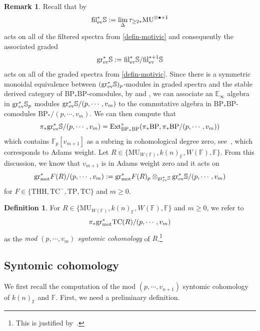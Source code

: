 \documentclass[english,10pt]{amsart}
\newcommand{\field}{\mathbb{F}}
\theoremstyle{definition}
\newtheorem{defi}{Definition}[section]
\newtheorem{rema}{Remark}[section]
\numberwithin{equation}{section}
\newcommand{\grmot}{\mathrm{gr}_{\textup{mot}}^*}
\begin{document}
\begin{rema}\label{rema:vn}
Recall that by~\cite[Corollary~2.2.21]{hahn2022motivic}
\[\mathrm{fil}_{\textup{ev}}^*\mathbb{S}:=\lim_{\Delta} \tau_{\ge 2*}\mathrm{MU}^{\otimes \bullet+1} 
\]
acts on all of the filtered spectra from \autoref{defin-motivic} and consequently the associated graded 
\[\mathrm{gr}_{\textup{ev}}^*\mathbb{S}:=\mathrm{fil}_{\textup{ev}}^*\mathbb{S}/\mathrm{fil}_{\textup{ev}}^{*+1}\mathbb{S}
\]
acts on all of the graded spectra from \autoref{defin-motivic}. Since there is a symmetric monoidal equivalence between $(\mathrm{gr}_{\textup{ev}}^*\mathbb{S})_p$-modules in graded spectra and the stable derived category of 
$\mathrm{BP}_*\mathrm{BP}$-comodules, by \cite[Corollary~1.1.6]{hahn2022motivic} and \cite[Corollary~1.2]{GWZ21},
we can associate an $\mathbb{E}_{\infty}$ algebra in $\mathrm{gr}_{\textup{ev}}^*\mathbb{S}_p$  modules $\mathrm{gr}_{\textup{ev}}^*\mathbb{S}/(p,\cdots ,v_m)$ to the commutative algebra in $\mathrm{BP}_*\mathrm{BP}$-comodules $\mathrm{BP}_*/(p,\cdots ,v_m)$. We can then compute that 
\[ \pi_*\mathrm{gr}_{\textup{ev}}^*\mathbb{S}/(p,\cdots ,v_m)= \mathrm{Ext}_{\mathrm{BP}_*\mathrm{BP}}^*(\pi_*\mathrm{BP},\pi_*\mathrm{BP}/(p,\cdots ,v_m))\]
which contains $\mathbb{F}_p[v_{m+1}]$ as a subring in cohomological degree zero, see~\cite[ Theorem~4.3.2]{Rav86}, which corresponds to Adams weight. Let $R\in\{\mathrm{MU}_{W(\field)},k(n)_{\field},W(\field),\field\}$. From this discussion, we know that $v_{m+1}$ is in Adams weight zero and it acts on 
\[
\mathrm{gr}_{\textup{mot}}^*F(R)/(p,\cdots ,v_m) := \mathrm{gr}_{\textup{mot}}^*F(R)_p\otimes_{\mathrm{gr}_{\textup{ev}}^*\mathbb{S}}\mathrm{gr}_{\textup{ev}}^*\mathbb{S}/(p,\cdots ,v_m)
\]
for $F\in \{\mathrm{THH},\mathrm{TC}^{-},\mathrm{TP},\mathrm{TC}\}$ and $m\ge 0$. 
\end{rema} 

\begin{defi}
For $R\in \{\mathrm{MU}_{W(\field)},k(n)_{\field},W(\field),\field\}$ and $m\ge 0$, we refer to 
\[ \pi_*\grmot \mathrm{TC}(R)/(p,\cdots ,v_m)\]
as the \emph{mod $(p,\cdots ,v_m)$ syntomic cohomology} of $R$.\footnote{This is justified by~\cite[Theorem~5.0.3]{hahn2022motivic}.} 
\end{defi}

\subsection{Syntomic cohomology}
We first recall the computation of the mod $(p,\cdots,v_{n+1})$ syntomic cohomology of $k(n)_{\field}$ and $\field$. First, we need a preliminary definition. 
\end{document}

